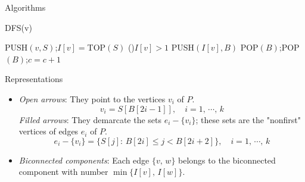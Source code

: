 \documentclass{beamer}
\begin{document}
\begin{frame}{Algorithms}
	\SetAlFnt{\small}
	\begin{procedure}[H]
		\caption{DFS(v)}
		PUSH$(v,S)$;\quad $I[v]=$TOP$(S)$\;
		\If(){$I[v] > 1$}{
			PUSH$(I[v],B)$\;
		}
		 {
			POP$(B)$;\quad POP$(B)$;\quad $c = c + 1$\;
		}
	\end{procedure}
\end{frame}

\begin{frame}{Representations}
	\begin{itemize}
		\item
		\emph{Open arrows}: They point to the vertices $v_i$ of $P$.
		$$v_i=S[B[2i-1]],\quad i=1,\,\cdots,\,k$$
		\emph{Filled arrows}: They demarcate the sets $e_i-\{v_i\}$; these sets
		are the "nonfirst" vertices of edges $e_i$ of $P$.
		$$e_i-\{v_i\}=\{S[j]:\,B[2i]\leq j < B[2i+2]\},\quad i=1,\,\cdots,\,k$$
		\item
		\emph{Biconnected components}: Each edge $\{v,\,w\}$ belongs to the
		biconnected component with number $\min\{I[v],\,I[w]\}$.
	\end{itemize}
\end{frame}
\end{document}
